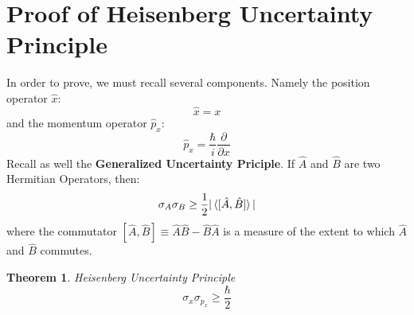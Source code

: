 \documentclass[hidelinks, a4paper, 12pt]{article}
\newtheorem{theorem}{Theorem}
\newcommand{\bd}{\textbf}
\newcommand{\xhat}{\hat{x}}
\newcommand{\pxhat}{\hat{p}_x}
\begin{document}
    \section{Proof of Heisenberg Uncertainty Principle}
        In order to prove, we must recall several components. Namely the position operator $\xhat$:
        \begin{equation}
            \xhat = x
        \end{equation}
        and the momentum operator $\pxhat$:
        \begin{equation}
            \pxhat = \frac{\hbar}{i}\frac{\partial}{\partial x}
        \end{equation}
        Recall as well the \bd{Generalized Uncertainty Priciple}. If $\hat{A}$ and $\hat{B}$ are two Hermitian Operators, then:
        \begin{equation}
            \sigma_A \sigma_B \geq \frac{1}{2}|\braket{[\hat{A}, \hat{B}]}|
        \end{equation}
        where the commutator $[\hat{A}, \hat{B}] \equiv \hat{A}\hat{B}-\hat{B}\hat{A}$ is a measure of the extent to which $\hat{A}$ and $\hat{B}$ commutes.
        \begin{theorem}
            Heisenberg Uncertainty Principle
            \[\sigma_x \sigma_{p_x} \geq \frac{\hbar}{2}\]
        \end{theorem}
\end{document}
